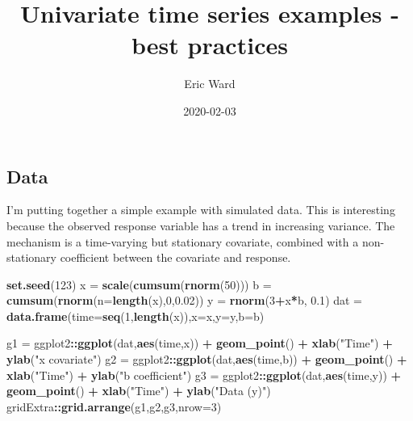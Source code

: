 \documentclass[]{article}
\title{Univariate time series examples - best practices}
\author{Eric Ward}
\date{2020-02-03}
\newenvironment{Shaded}{\begin{snugshade}}{\end{snugshade}}
\newcommand{\DataTypeTok}[1]{\textcolor[rgb]{0.13,0.29,0.53}{#1}}
\newcommand{\DecValTok}[1]{\textcolor[rgb]{0.00,0.00,0.81}{#1}}
\newcommand{\FloatTok}[1]{\textcolor[rgb]{0.00,0.00,0.81}{#1}}
\newcommand{\KeywordTok}[1]{\textcolor[rgb]{0.13,0.29,0.53}{\textbf{#1}}}
\newcommand{\NormalTok}[1]{#1}
\newcommand{\OperatorTok}[1]{\textcolor[rgb]{0.81,0.36,0.00}{\textbf{#1}}}
\newcommand{\StringTok}[1]{\textcolor[rgb]{0.31,0.60,0.02}{#1}}
\begin{document}
\maketitle

\hypertarget{data}{%
\subsection{Data}\label{data}}

I'm putting together a simple example with simulated data. This is
interesting because the observed response variable has a trend in
increasing variance. The mechanism is a time-varying but stationary
covariate, combined with a non-stationary coefficient between the
covariate and response.

\begin{Shaded}
\begin{Highlighting}[]
\KeywordTok{set.seed}\NormalTok{(}\DecValTok{123}\NormalTok{)}
\NormalTok{x =}\StringTok{ }\KeywordTok{scale}\NormalTok{(}\KeywordTok{cumsum}\NormalTok{(}\KeywordTok{rnorm}\NormalTok{(}\DecValTok{50}\NormalTok{)))}
\NormalTok{b =}\StringTok{ }\KeywordTok{cumsum}\NormalTok{(}\KeywordTok{rnorm}\NormalTok{(}\DataTypeTok{n=}\KeywordTok{length}\NormalTok{(x),}\DecValTok{0}\NormalTok{,}\FloatTok{0.02}\NormalTok{))}
\NormalTok{y =}\StringTok{ }\KeywordTok{rnorm}\NormalTok{(}\DecValTok{3}\OperatorTok{+}\NormalTok{x}\OperatorTok{*}\NormalTok{b, }\FloatTok{0.1}\NormalTok{)}
\NormalTok{dat =}\StringTok{ }\KeywordTok{data.frame}\NormalTok{(}\DataTypeTok{time=}\KeywordTok{seq}\NormalTok{(}\DecValTok{1}\NormalTok{,}\KeywordTok{length}\NormalTok{(x)),}\DataTypeTok{x=}\NormalTok{x,}\DataTypeTok{y=}\NormalTok{y,}\DataTypeTok{b=}\NormalTok{b)}

\NormalTok{g1 =}\StringTok{ }\NormalTok{ggplot2}\OperatorTok{::}\KeywordTok{ggplot}\NormalTok{(dat,}\KeywordTok{aes}\NormalTok{(time,x)) }\OperatorTok{+}\StringTok{ }\KeywordTok{geom_point}\NormalTok{() }\OperatorTok{+}\StringTok{ }
\StringTok{  }\KeywordTok{xlab}\NormalTok{(}\StringTok{"Time"}\NormalTok{) }\OperatorTok{+}\StringTok{ }\KeywordTok{ylab}\NormalTok{(}\StringTok{"x covariate"}\NormalTok{)}
\NormalTok{g2 =}\StringTok{ }\NormalTok{ggplot2}\OperatorTok{::}\KeywordTok{ggplot}\NormalTok{(dat,}\KeywordTok{aes}\NormalTok{(time,b)) }\OperatorTok{+}\StringTok{ }\KeywordTok{geom_point}\NormalTok{() }\OperatorTok{+}\StringTok{ }
\StringTok{  }\KeywordTok{xlab}\NormalTok{(}\StringTok{"Time"}\NormalTok{) }\OperatorTok{+}\StringTok{ }\KeywordTok{ylab}\NormalTok{(}\StringTok{"b coefficient"}\NormalTok{)}
\NormalTok{g3 =}\StringTok{ }\NormalTok{ggplot2}\OperatorTok{::}\KeywordTok{ggplot}\NormalTok{(dat,}\KeywordTok{aes}\NormalTok{(time,y)) }\OperatorTok{+}\StringTok{ }\KeywordTok{geom_point}\NormalTok{() }\OperatorTok{+}\StringTok{ }
\StringTok{  }\KeywordTok{xlab}\NormalTok{(}\StringTok{"Time"}\NormalTok{) }\OperatorTok{+}\StringTok{ }\KeywordTok{ylab}\NormalTok{(}\StringTok{"Data (y)"}\NormalTok{)}
\NormalTok{gridExtra}\OperatorTok{::}\KeywordTok{grid.arrange}\NormalTok{(g1,g2,g3,}\DataTypeTok{nrow=}\DecValTok{3}\NormalTok{)}
\end{Highlighting}
\end{Shaded}
\end{document}
